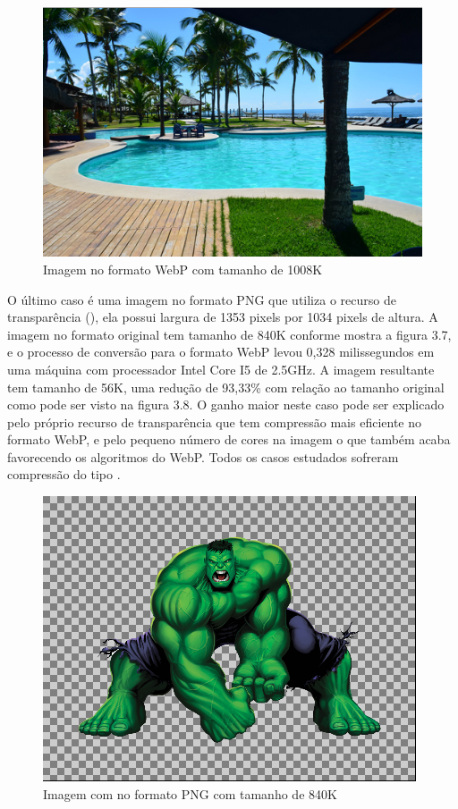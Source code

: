\documentclass[espaco=simples,appendix=Name]{abnt}
\begin{document}
\begin{figure}[h]
  \centering
    \includegraphics[scale=0.5]{Imagem2WEBP.png}
  \caption{Imagem no formato WebP com tamanho de 1008K}
\end{figure}

O último caso é uma imagem no formato PNG que utiliza o recurso de transparência (), ela possui largura de 1353 pixels por 1034 pixels de altura. A imagem no formato original tem tamanho de 840K conforme mostra a figura 3.7, e o processo de conversão para o formato WebP levou 0,328 milissegundos em uma máquina com processador Intel Core I5 de 2.5GHz. A imagem resultante tem tamanho de 56K, uma redução de 93,33\% com relação ao tamanho original como pode ser visto na figura 3.8. O ganho maior neste caso pode ser explicado pelo próprio recurso de transparência que tem compressão mais eficiente no formato WebP, e pelo pequeno número de cores na imagem o que também acaba favorecendo os algoritmos do WebP. Todos os casos estudados sofreram compressão do tipo .

\begin{figure}[h]
  \centering
    \includegraphics[scale=0.5]{Imagem3AlphaPNG.png}
  \caption{Imagem com  no formato PNG com tamanho de 840K}
\end{figure}
\end{document}
